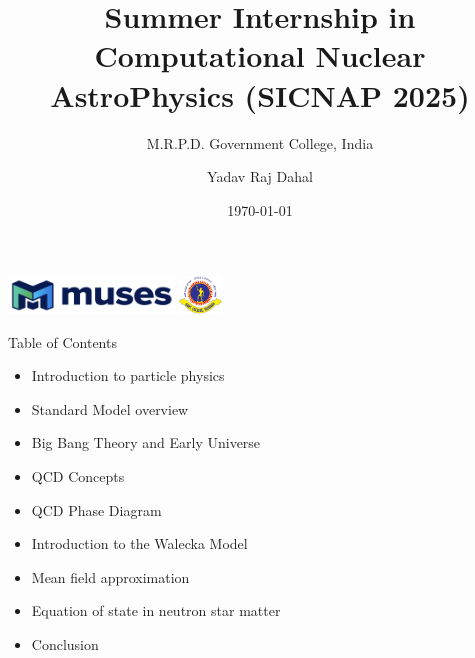 \documentclass[12pt,aspectratio169]{beamer}
\title{Summer Internship in Computational Nuclear AstroPhysics (SICNAP 2025)}
\subtitle{M.R.P.D. Government College, India}
\author{Yadav Raj Dahal}
\date{\today}
\begin{document}
\begin{frame}
  \titlepage

  \vspace{1cm}

  \begin{center}
    \includegraphics[height=1cm]{MUSES.png} \hspace{1cm}
    \includegraphics[height=1cm]{mrpd.png}
  \end{center}
\end{frame}
\begin{frame}{Table of Contents}
\begin{itemize}
    \item Introduction to particle physics
    \item Standard Model overview
    \item Big Bang Theory and Early Universe
    \item QCD Concepts
    \item QCD Phase Diagram
    \item Introduction to the Walecka Model
    \item Mean field approximation
    \item Equation of state in neutron star matter
    \item Conclusion
    
\end{itemize}
\end{frame}
\end{document}
